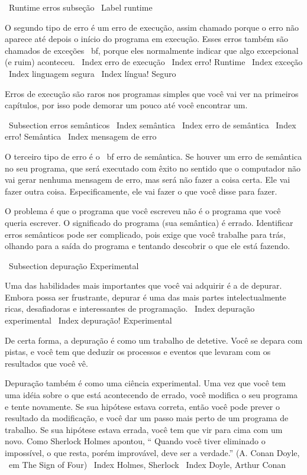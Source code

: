 \documentclass[10pt]{book}
\begin{document}
{\ {Runtime erros} subseção
\ Label {} runtime

O segundo tipo de erro é um erro de execução, assim chamado porque o
erro não aparece até depois o início do programa em execução.
Esses erros também são chamados de exceções {\ bf}, porque eles normalmente
indicar que algo excepcional (e ruim) aconteceu.
\ Index {erro de execução}
\ Index {erro! Runtime}
\ Index {exceção}
\ Index {linguagem segura}
\ Index {língua! Seguro}

Erros de execução são raros nos programas simples que você vai ver na
primeiros capítulos, por isso pode demorar um pouco até você encontrar um.


\ Subsection {erros semânticos}
\ Index {} semântica
\ Index {erro de semântica}
\ Index {erro! Semântica}
\ Index {mensagem de erro}

O terceiro tipo de erro é o {\ bf erro de semântica}. Se houver um
erro de semântica no seu programa, que será executado com êxito no sentido
que o computador não vai gerar nenhuma mensagem de erro, mas será
não fazer a coisa certa. Ele vai fazer outra coisa. Especificamente, ele
vai fazer o que você disse para fazer.

O problema é que o programa que você escreveu não é o programa que você
queria escrever. O significado do programa (sua semântica) é errado.
Identificar erros semânticos pode ser complicado, pois exige que você trabalhe
para trás, olhando para a saída do programa e tentando descobrir
o que ele está fazendo.

\ Subsection {depuração Experimental}

Uma das habilidades mais importantes que você vai adquirir é a de depurar.
Embora possa ser frustrante, depurar é uma das mais
partes intelectualmente ricas, desafiadoras e interessantes de
programação.
\ Index {depuração experimental}
\ Index {depuração! Experimental}

De certa forma, a depuração é como um trabalho de detetive. Você se depara
com pistas, e você tem que deduzir os processos e eventos que levaram
com os resultados que você vê.

Depuração também é como uma ciência experimental. Uma vez que você tem uma idéia
sobre o que está acontecendo de errado, você modifica o seu programa e tente novamente. Se
sua hipótese estava correta, então você pode prever o resultado da
modificação, e você dar um passo mais perto de um programa de trabalho. Se
sua hipótese estava errada, você tem que vir para cima com um novo. Como
Sherlock Holmes apontou, `` Quando você tiver eliminado o
impossível, o que resta, porém improvável, deve ser a verdade.''
(A. Conan Doyle, {\ em The Sign of Four})
\ Index {Holmes, Sherlock}
\ Index {Doyle, Arthur Conan}

}
\end{document}
